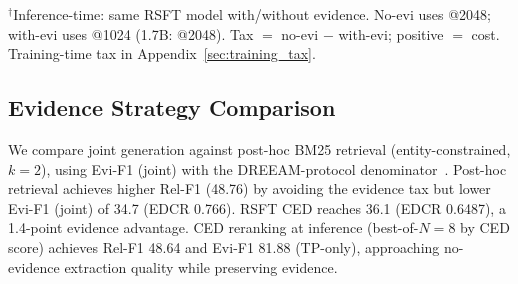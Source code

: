 \begin{table}[t]
\centering
\caption{RSFT performance and inference-time evidence tax across model scales (DocRED dev Ign-F1). LLaMA-3.1-8B included for cross-family validation. Mean $\pm$ std$^{(\text{seeds})}$.}
\label{tab:scaling}
\small
{}
\vspace{1mm}
{\raggedright\footnotesize $^\dagger$Inference-time: same RSFT model with/without evidence. No-evi uses @2048; with-evi uses @1024 (1.7B: @2048). Tax $=$ no-evi $-$ with-evi; positive $=$ cost. Training-time tax in Appendix~\ref{sec:training_tax}.\par}
\end{table}

\subsection{Evidence Strategy Comparison}
\label{sec:evidence_strategy}

We compare joint generation against post-hoc BM25 retrieval (entity-constrained, $k{=}2$), using Evi-F1 (joint) with the DREEAM-protocol denominator~\citep{ma2023dreeam}. Post-hoc retrieval achieves higher Rel-F1 (48.76) by avoiding the evidence tax but lower Evi-F1 (joint) of 34.7 (EDCR 0.766). RSFT CED reaches 36.1 (EDCR 0.6487), a 1.4-point evidence advantage. CED reranking at inference (best-of-$N{=}8$ by CED score) achieves Rel-F1 48.64 and Evi-F1 81.88 (TP-only), approaching no-evidence extraction quality while preserving evidence.


